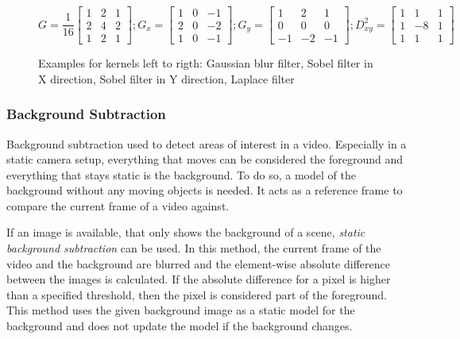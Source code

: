 \begin{figure}[h!]
\begin{equation*}
    G = 
    \dfrac{1}{16}
    \begin{bmatrix}
    1 & 2 & 1 \\
    2 & 4 & 2 \\
    1 & 2 & 1
    \end{bmatrix}
    ;
    G_x = 
    \begin{bmatrix}
    1 & 0 & -1 \\
    2 & 0 & -2 \\
    1 & 0 & -1
    \end{bmatrix}
    ;
    G_y = 
    \begin{bmatrix}
    1 & 2 & 1 \\
    0 & 0 & 0 \\
    -1 & -2 & -1
    \end{bmatrix}
    ;
    D_{xy}^{2} = 
    \begin{bmatrix}
    1 & 1 & 1 \\
    1 & -8 & 1 \\
    1 & 1 & 1
    \end{bmatrix}
\end{equation*}
\caption{Examples for kernels left to rigth: Gaussian blur filter, Sobel filter in X direction, Sobel filter in Y direction, Laplace filter}
\label{eq:sota:kernels}
\end{figure}

\subsubsection{Background Subtraction}
Background subtraction used to detect areas of interest in a video.
Especially in a static camera setup, everything that moves can be considered the foreground and everything that stays static is the background. 
To do so, a model of the background without any moving objects is needed.
It acts as a reference frame to compare the current frame of a video against.

If an image is available, that only shows the background of a scene,
\emph{static background subtraction} can be used.
In this method, the current frame of the video and the background are blurred 
and the element-wise absolute difference between the images is calculated.
If the absolute difference for a pixel is higher than a specified threshold, then the pixel is considered part of the foreground.
This method uses the given background image as a static model for the background and does not update the model if the background changes.

